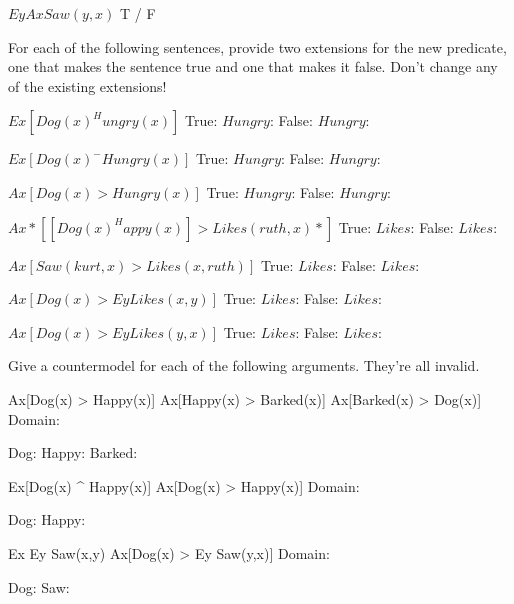 $ Ey Ax Saw(y,x) $
	\answer
	 T / F
	\endanswer

\endproblems

For each of the following sentences, provide two extensions for the new predicate, one that makes the sentence true and one that makes it false. Don't change any of the existing extensions!

\problems
{}
$ Ex[Dog(x) ^ Hungry(x)] $
	\answer
	True: $Hungry$: 
	False: $Hungry$: 
	\endanswer

$ Ex[Dog(x) ^ -Hungry(x)] $
	\answer
	True: $Hungry$: 
	False: $Hungry$: 
	\endanswer

$ Ax[Dog(x) > Hungry(x)] $
	\answer
	True: $Hungry$: 
	False: $Hungry$: 
	\endanswer

$ Ax*[[Dog(x) ^ Happy(x)] > Likes(ruth,x)*] $
	\answer
	True: $Likes$: 
	False: $Likes$: 
	\endanswer

$ Ax[Saw(kurt,x) > Likes(x,ruth)] $
	\answer
	True: $Likes$: 
	False: $Likes$: 
	\endanswer

$ Ax[Dog(x) > Ey Likes(x,y)] $
	\answer
	True: $Likes$: 
	False: $Likes$: 
	\endanswer

$ Ax[Dog(x) > Ey Likes(y,x)] $
	\answer
	True: $Likes$: 
	False: $Likes$: 
	\endanswer

\endproblems

Give a countermodel for each of the following arguments. They're all invalid.

\problems
{}
\argument
 Ax[Dog(x) > Happy(x)]
 Ax[Happy(x) > Barked(x)]
\argumentline
 Ax[Barked(x) > Dog(x)]
\endargument
	\answer
	\firstordermodel
	Domain: 

	Dog:    
	Happy:  
	Barked: 
	\endfirstordermodel
	\endanswer

\argument
 Ex[Dog(x) ^ Happy(x)]
\argumentline
 Ax[Dog(x) > Happy(x)]
\endargument
	\answer
	\firstordermodel
	Domain: 

	Dog:    
	Happy:  
	\endfirstordermodel
	\endanswer

\argument
 Ex Ey Saw(x,y)
\argumentline
 Ax[Dog(x) > Ey Saw(y,x)]
\endargument
	\answer
	\firstordermodel
	Domain: 

	Dog:    
	Saw:    
	\endfirstordermodel
	\endanswer

\endproblems
\bye
